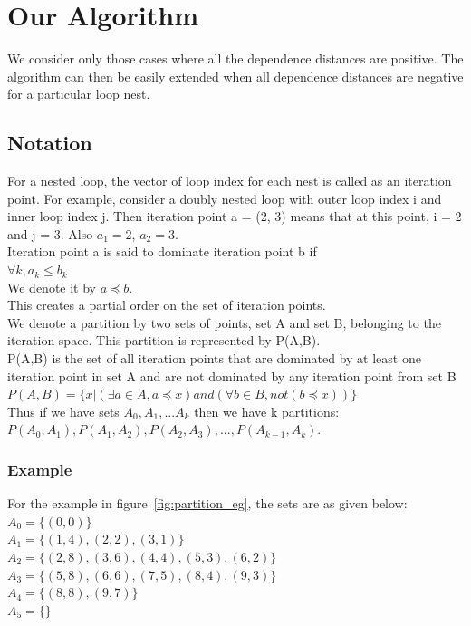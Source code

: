 \chapter{Our Algorithm}
We consider only those cases where all the dependence distances are positive. The algorithm can then be easily extended when all dependence distances are negative for a particular loop nest.
\section{Notation}
For a nested loop, the vector of loop index for each nest is called as an iteration point. For example, consider a doubly nested loop with outer loop index i and inner loop index j. Then iteration point a = (2, 3) means that at this point, i = 2 and j = 3. Also $a_1 = 2$, $a_2 = 3.$ \\

Iteration point a is said to dominate iteration point b if\\
 $ \forall k,  a_k \leq b_k$ \\
We denote it by $a \preceq b$.\\
This creates a partial order on the set of iteration points.\\

We denote a partition by two sets of points, set A and set B, belonging to the iteration space. This partition is represented by P(A,B). \\

P(A,B) is the set of all iteration points that are dominated by at least one iteration point in set A and are not dominated by any iteration point from set B \\
$P(A,B) = \{x | ( \exists a \in A, a \preceq x) and (\forall b \in B, not(b \preceq x))\}$ \\

Thus if we have sets $A_0, A_1, ... A_k$ then we have k partitions: \\
$P(A_0,A_1), P(A_1, A_2), P(A_2, A_3), ... , P(A_{k-1}, A_k)$. \\

\subsection{Example}

For the example in figure~\ref{fig:partition_eg}, the sets are as given below: \\
$A_0 = \{(0,0)\}$ \\
$A_1 = \{(1,4), (2,2), (3,1)\}$ \\
$A_2 = \{(2,8), (3,6), (4,4), (5,3), (6,2)\}$ \\
$A_3 = \{(5,8), (6,6), (7,5), (8,4), (9,3)\}$ \\
$A_4 = \{(8,8), (9,7)\}$ \\
$A_5 = \{\}$ \\

